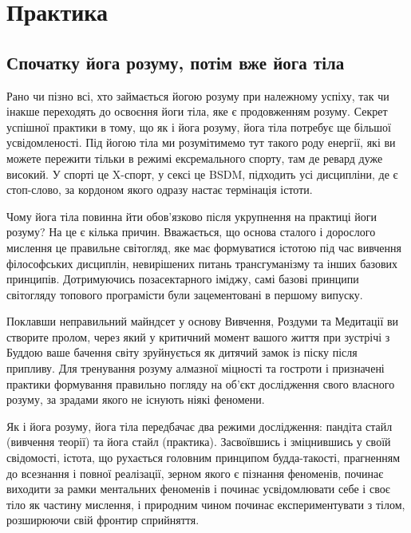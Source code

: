 \section{Практика}

\subsection{Спочатку йога розуму, потім вже йога тіла}

Рано чи пізно всі, хто займається йогою розуму при належному
успіху, так чи інакше переходять до освоєння йоги тіла, яке
є продовженням розуму. Секрет успішної практики в тому, що
як і йога розуму, йога тіла потребує ще більшої усвідомленості.
Під йогою тіла ми розумітимемо тут такого роду енергії,
які ви можете пережити тільки в режимі ексремального спорту,
там де ревард дуже високий. У спорті це X-спорт, у сексі це
BSDM, підходить усі дисципліни, де є стоп-слово, за кордоном
якого одразу настає термінація істоти.

Чому йога тіла повинна йти обов'язково після укрупнення
на практиці йоги розуму? На це є кілька причин. Вважається,
що основа сталого і дорослого мислення це правильне світогляд,
яке має формуватися істотою під час вивчення філософських
дисциплін, невирішених питань трансгуманізму та інших
базових принципів. Дотримуючись позасектарного іміджу,
самі базові принципи світогляду топового програмісти
були зацементовані в першому випуску.

Поклавши неправильний майндсет у основу Вивчення,
Роздуми та Медитації ви створите пролом, через який
у критичний момент вашого життя при зустрічі з Буддою
ваше бачення світу зруйнується як дитячий замок із піску
після припливу. Для тренування розуму алмазної міцності
та гостроти і призначені практики формування правильно
погляду на об'єкт дослідження свого власного розуму,
за зрадами якого не існують ніякі феномени.

Як і йога розуму, йога тіла передбачає два режими
дослідження: пандіта стайл (вивчення теорії) та йога
стайл (практика). Засвоївшись і зміцнившись у своїй
свідомості, істота, що рухається головним принципом
будда-такості, прагненням до всезнання і повної реалізації,
зерном якого є пізнання феноменів, починає виходити за
рамки ментальних феноменів і починає усвідомлювати себе
і своє тіло як частину мислення, і природним чином
починає експериментувати з тілом, розширюючи свій
фронтир сприйняття.

